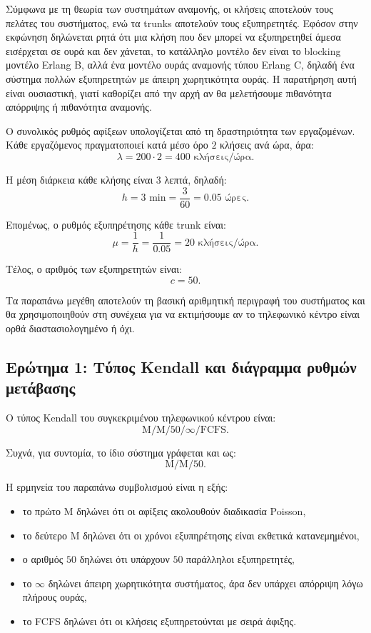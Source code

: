 \documentclass{article}
\begin{document}
Σύμφωνα με τη θεωρία των συστημάτων αναμονής, οι κλήσεις αποτελούν τους πελάτες του συστήματος, ενώ τα trunks αποτελούν τους εξυπηρετητές. Εφόσον στην εκφώνηση δηλώνεται ρητά ότι μια κλήση που δεν μπορεί να εξυπηρετηθεί άμεσα εισέρχεται σε ουρά και δεν χάνεται, το κατάλληλο μοντέλο δεν είναι το \foreignlanguage{english}{blocking} μοντέλο Erlang B, αλλά ένα μοντέλο ουράς αναμονής τύπου Erlang C, δηλαδή ένα σύστημα πολλών εξυπηρετητών με άπειρη χωρητικότητα ουράς. Η παρατήρηση αυτή είναι ουσιαστική, γιατί καθορίζει από την αρχή αν θα μελετήσουμε πιθανότητα απόρριψης ή πιθανότητα αναμονής.

Ο συνολικός ρυθμός αφίξεων υπολογίζεται από τη δραστηριότητα των εργαζομένων. Κάθε εργαζόμενος πραγματοποιεί κατά μέσο όρο $2$ κλήσεις ανά ώρα, άρα:
\[
\lambda = 200 \cdot 2 = 400 \text{ κλήσεις/ώρα}.
\]

Η μέση διάρκεια κάθε κλήσης είναι $3$ λεπτά, δηλαδή:
\[
h = 3 \text{ min} = \frac{3}{60} = 0.05 \text{ ώρες}.
\]

Επομένως, ο ρυθμός εξυπηρέτησης κάθε trunk είναι:
\[
\mu = \frac{1}{h} = \frac{1}{0.05} = 20 \text{ κλήσεις/ώρα}.
\]

Τέλος, ο αριθμός των εξυπηρετητών είναι:
\[
c = 50.
\]

Τα παραπάνω μεγέθη αποτελούν τη βασική αριθμητική περιγραφή του συστήματος και θα χρησιμοποιηθούν στη συνέχεια για να εκτιμήσουμε αν το τηλεφωνικό κέντρο είναι ορθά διαστασιολογημένο ή όχι.

\subsection{Ερώτημα 1: Τύπος Kendall και διάγραμμα ρυθμών μετάβασης}

Ο τύπος Kendall του συγκεκριμένου τηλεφωνικού κέντρου είναι:
\[
\mathrm{M/M/50/\infty/FCFS}.
\]

Συχνά, για συντομία, το ίδιο σύστημα γράφεται και ως:
\[
\mathrm{M/M/50}.
\]

Η ερμηνεία του παραπάνω συμβολισμού είναι η εξής:
\begin{itemize}
    \item το πρώτο $\mathrm{M}$ δηλώνει ότι οι αφίξεις ακολουθούν διαδικασία Poisson,
    \item το δεύτερο $\mathrm{M}$ δηλώνει ότι οι χρόνοι εξυπηρέτησης είναι εκθετικά κατανεμημένοι,
    \item ο αριθμός $50$ δηλώνει ότι υπάρχουν $50$ παράλληλοι εξυπηρετητές,
    \item το $\infty$ δηλώνει άπειρη χωρητικότητα συστήματος, άρα δεν υπάρχει απόρριψη λόγω πλήρους ουράς,
    \item το \foreignlanguage{english}{FCFS} δηλώνει ότι οι κλήσεις εξυπηρετούνται με σειρά άφιξης.
\end{itemize}
\end{document}

